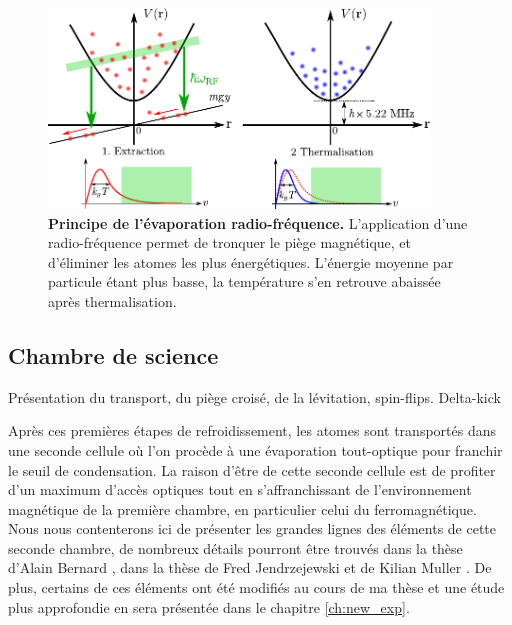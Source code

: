 \begin{figure}
\centering
\includegraphics[width=0.9\textwidth]{Fig/BEC_manip/evapRF.pdf}
\caption{\textbf{Principe de l'évaporation radio-fréquence.} L'application d'une radio-fréquence permet de tronquer le piège magnétique, et d'éliminer les atomes les plus énergétiques. L'énergie moyenne par particule étant plus basse, la température s'en retrouve abaissée après thermalisation.}
\label{fig:evapRF}
\end{figure}


\subsection{Chambre de science}
Présentation du transport, du piège croisé, de la lévitation, spin-flips. Delta-kick

Après ces premières étapes de refroidissement, les atomes sont transportés dans une seconde cellule où l'on procède à une évaporation tout-optique pour franchir le seuil de condensation. La raison d'être de cette seconde cellule est de profiter d'un maximum d'accès optiques tout en s'affranchissant de l'environnement magnétique de la première chambre, en particulier celui du ferromagnétique.
Nous nous contenterons ici de présenter les grandes lignes des éléments de cette seconde chambre, de nombreux détails pourront être trouvés dans la thèse d'Alain Bernard \citep{bernard2010transport}, dans la thèse de Fred Jendrzejewski \citep{jendrzejewski2012quantum} et de Kilian Muller \citep{muller2015coherent}. De plus, certains de ces éléments ont été modifiés au cours de ma thèse et une étude plus approfondie en sera présentée dans le chapitre \ref{ch:new_exp}.

